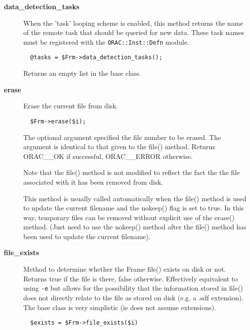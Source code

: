\begin{description}
\begin{description}
\item[{\textbf{data\_detection\_tasks}}] \mbox{}

When the 'task' looping scheme is enabled, this method returns the name
of the remote task that should be queried for new data. These task names
must be registered with the \texttt{ORAC::Inst::Defn} module.

\begin{verbatim}
  @tasks = $Frm->data_detection_tasks();
\end{verbatim}


Returns an empty list in the base class.


\item[{\textbf{erase}}] \mbox{}

Erase the current file from disk.

\begin{verbatim}
  $Frm->erase($i);
\end{verbatim}


The optional argument specified the file number to be erased.
The argument is identical to that given to the file() method.
Returns ORAC\_\_OK if successful, ORAC\_\_ERROR otherwise.



Note that the file() method is not modified to reflect the
fact the the file associated with it has been removed from disk.



This method is usually called automatically when the file()
method is used to update the current filename and the nokeep()
flag is set to true. In this way, temporary files can be removed
without explicit use of the erase() method. (Just need to
use the nokeep() method after the file() method has been used
to update the current filename).


\item[{\textbf{file\_exists}}] \mbox{}

Method to determine whether the Frame file() exists on disk or not.
Returns true if the file is there, false otherwise. Effectively
equivalent to using \texttt{-e} but allows for the possibility that the
information stored in file() does not directly relate to the
file as stored on disk (e.g. a .sdf extension). The base class is
very simplistic (ie does not assume extensions).

\begin{verbatim}
  $exists = $Frm->file_exists($i)
\end{verbatim}



\end{description}
\end{description}
